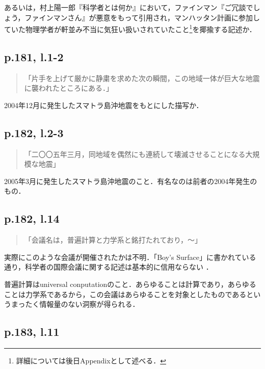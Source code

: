 \documentclass[10pt, a5paper, twoside]{ltjsarticle}
\begin{document}
            あるいは，村上陽一郎『科学者とは何か』\cite{murakami}において，ファインマン『ご冗談でしょう，ファインマンさん』\cite{fynman1}が悪意をもって引用され，マンハッタン計画に参加していた物理学者が軒並み不当に気狂い扱いされていたこと\footnote{詳細については後日Appendixとして述べる．}を揶揄する記述か．

        \subsection{p.181, l.1-2}

            \begin{quote}
                「片手を上げて厳かに静粛を求めた次の瞬間，この地域一体が巨大な地震に襲われたところにある．」
            \end{quote}

            2004年12月に発生したスマトラ島沖地震をもとにした描写か．

        \subsection{p.182, l.2-3}

            \begin{quote}
                「二〇〇五年三月，同地域を偶然にも連続して壊滅させることになる大規模な地震」
            \end{quote}

            2005年3月に発生したスマトラ島沖地震のこと．有名なのは前者の2004年発生のもの．

        \subsection{p.182, l.14}

            \begin{quote}
                「会議名は，普遍計算と力学系と銘打たれており，〜」
            \end{quote}

            実際にこのような会議が開催されたかは不明．「Boy's Surface」に書かれている通り，科学者の国際会議に関する記述は基本的に信用ならない
            ．

            普遍計算はuniversal conputationのこと．あらゆることは計算であり，あらゆることは力学系であるから，この会議はあらゆることを対象としたものであるというまったく情報量のない洞察が得られる．

        \subsection{p.183, l.11}
\end{document}
